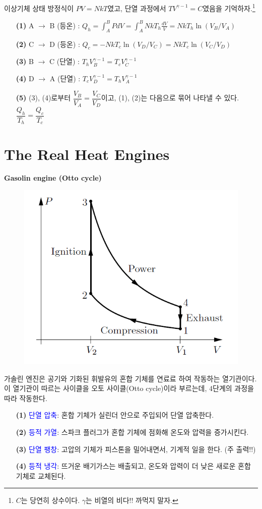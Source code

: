 \documentclass{article}
\begin{document}
\noindent
이상기체 상태 방정식이 $\boxed{PV = NkT}$였고, 단열 과정에서 $\boxed{TV^{\gamma - 1} = C}$였음을 기억하자.\footnote{$C$는 당연히 상수이다. $\gamma$는 비열의 비다!! 까먹지 말자.}

\begin{enumerate}
    \item[\textbf{(1)}] A $\rightarrow$ B (등온) : $Q_h = \int_A^B PdV = \int_A^B NkT_h \frac{dV}{V} = NkT_h \ln (V_B / V_A)$
    \item[\textbf{(2)}] C $\rightarrow$ D (등온) : $Q_c = -NkT_c \ln (V_D / V_C) = NkT_c \ln (V_C / V_D)$\
    \item[\textbf{(3)}] B $\rightarrow$ C (단열) : $T_h V_B^{\gamma -1} = T_c V_C^{\gamma -1}$
    \item[\textbf{(4)}] D $\rightarrow$ A (단열) : $T_c V_D^{\gamma -1} = T_h V_A^{\gamma -1}$
    \item[\textbf{(5)}] (3), (4)로부터 $\dfrac{V_B}{V_A} = \dfrac{V_C}{V_D}$이고, (1), (2)는 다음으로 묶어 나타낼 수 있다. $\boxed{\dfrac{Q_h}{T_h} = \dfrac{Q_c}{T_c}}$
\end{enumerate}


\newpage

\section{The Real Heat Engines}

\textbf{Gasolin engine (Otto cycle)}

\begin{figure}[h]
    \centering
    \includegraphics[width=0.45\linewidth]{images/fig3_1.png}
\end{figure}

\noindent
가솔린 엔진은 공기와 기화된 휘발유의 혼합 기체를 연료료 하여 작동하는 열기관이다. 이 열기관이 따르는 사이클을 오토 사이클(Otto cycle)이라 부르는데, 4단계의 과정을 따라 작동한다.

\begin{enumerate}
    \item[\textbf{(1)}] \textcolor{blue}{단열 압축}: 혼합 기체가 실린더 안으로 주입되어 단열 압축한다.
    \item[\textbf{(2)}] \textcolor{blue}{등적 가열}: 스파크 플러그가 혼합 기체에 점화해 온도와 압력을 증가시킨다. 
    \item[\textbf{(3)}] \textcolor{blue}{단열 팽창}: 고압의 기체가 피스톤을 밀어내면서, 기계적 일을 한다. (주 출력!!)
    \item[\textbf{(4)}] \textcolor{blue}{등적 냉각}: 뜨거운 배기가스는 배출되고, 온도와 압력이 더 낮은 새로운 혼합 기체로 교체된다.
\end{enumerate}
\end{document}
